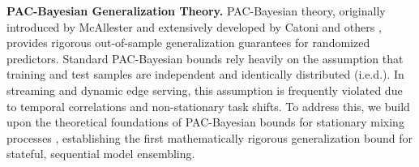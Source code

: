 \textbf{PAC-Bayesian Generalization Theory.} PAC-Bayesian theory, originally introduced by McAllester \cite{mcallester1999pac, mcallester2003pac} and extensively developed by Catoni \cite{catoni2007pac} and others \cite{guedj2019primer, alquier2021user}, provides rigorous out-of-sample generalization guarantees for randomized predictors. Standard PAC-Bayesian bounds rely heavily on the assumption that training and test samples are independent and identically distributed (i.e.d.). In streaming and dynamic edge serving, this assumption is frequently violated due to temporal correlations and non-stationary task shifts. To address this, we build upon the theoretical foundations of PAC-Bayesian bounds for stationary mixing processes \cite{alquier2013pac}, establishing the first mathematically rigorous generalization bound for stateful, sequential model ensembling.
